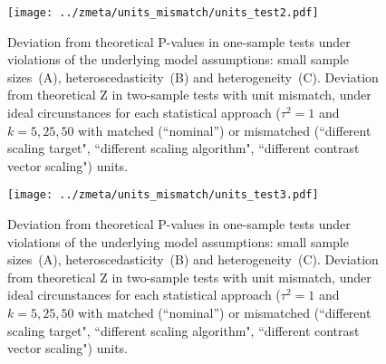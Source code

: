 \documentclass[preprint]{elsarticle}
\newcommand{\nStudies}{k}
\newcommand{\varBetween}{\tau^2}
\begin{document}
\begin{figure}[h]
	\centering
 	\texttt{[image: ../zmeta/units\_mismatch/units\_test2.pdf]}
	\caption{Deviation from theoretical P-values in one-sample tests under violations of the underlying model assumptions: small sample sizes~(A), heteroscedasticity~(B) and heterogeneity~(C). Deviation from theoretical Z in two-sample tests with unit mismatch, under ideal circunstances for each statistical approach ($\varBetween=1$ and $\nStudies = 5, 25, 50$ with matched (``nominal'') or mismatched (``different scaling target", ``different scaling algorithm", ``different contrast vector scaling") units.}
	\label{fig:units_test2}
\end{figure}

\begin{figure}[h]
	\centering
 	\texttt{[image: ../zmeta/units\_mismatch/units\_test3.pdf]}
	\caption{Deviation from theoretical P-values in one-sample tests under violations of the underlying model assumptions: small sample sizes~(A), heteroscedasticity~(B) and heterogeneity~(C). Deviation from theoretical Z in two-sample tests with unit mismatch, under ideal circunstances for each statistical approach ($\varBetween=1$ and $\nStudies = 5, 25, 50$ with matched (``nominal'') or mismatched (``different scaling target", ``different scaling algorithm", ``different contrast vector scaling") units.}
	\label{fig:units_test3}
\end{figure}








\end{document}
